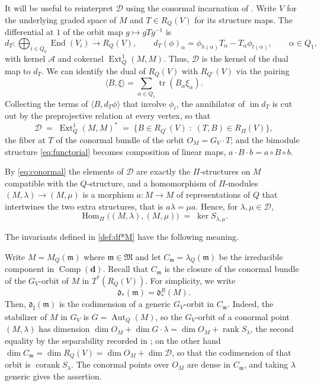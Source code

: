 \documentclass[12pt]{article}
\def\xspace{ }%
\theoremstyle{definition}
\newcommand{\prigity}{pseudorigidity\xspace}
\newcommand{\bd}{\boldsymbol{d}}  %
\newcommand{\tr}{\operatorname{tr}}
\newcommand{\Ext}{\operatorname{Ext}}
\newcommand{\Hom}{\operatorname{Hom}}
\newcommand{\End}{\operatorname{End}}
\newcommand{\Aut}{\operatorname{Aut}}
\newcommand{\Comp}{\operatorname{Comp}}
\newcommand{\cmp}{C}                       %
\newcommand{\Mfr}{\mathfrak{M}}
\newcommand{\mm}{\mathfrak{m}}
\newcommand{\alg}{\mathcal{A}}   %
\newcommand{\bmdl}{\mathcal{D}}   %
\newcommand{\qvert}{Q_0}    %
\newcommand{\qarr}{Q_1}     %
\newcommand{\dfr}{\mathfrak{d}}  %
\newcommand{\Sop}{S}
\newcommand{\rsub}{\sharp}       %
\newcommand{\psub}{\flat}        %
\newcommand{\rank}{\operatorname{rank}}
\newcommand{\cork}{\operatorname{corank}}
\newcommand{\im}{\operatorname{im}}
\begin{document}
It will be useful to reinterpret $\bmdl$ using the conormal incarnation of
. Write $V$ for the underlying graded
space of $M$ and $T \in R_Q(V)$ for its structure maps. The differential at
$1$ of the orbit map $g \mapsto gTg^{-1}$ is
\begin{equation}\label{eq:dT}
   d_T : \bigoplus_{i\in \qvert}\End(V_i)\longrightarrow R_Q(V), \qquad
   d_T(\phi)_\alpha = \phi_{h(\alpha)}T_\alpha - T_\alpha\phi_{t(\alpha)} ,
   \qquad \alpha\in\qarr ,
\end{equation}
with kernel $\alg$ and cokernel $\Ext^1_Q(M,M)$. Thus, $\bmdl$ is the kernel of the dual map to $d_T$.
We can identify the dual of $R_Q(V)$ with $R_{Q^\circ}(V)$ via the pairing
\[
\langle B,\xi\rangle =\sum_{\alpha\in\qarr}\tr(B_\alpha\xi_\alpha).
\]
Collecting the terms of $\langle B, d_T\phi\rangle$ that involve $\phi_i$, the annihilator of
$\im d_T$ is cut out by the preprojective relation at every vertex, so that
\begin{equation}\label{eq:conormal}
   \bmdl \;=\; \Ext^1_Q(M,M)^* \;=\;
   \bigl\{B \in R_{Q^\circ}(V) \;:\; (T,B) \in R_\Pi(V)\bigr\} ,
\end{equation}
the fiber at $T$ of the conormal bundle of the orbit $O_M=G_V\cdot T$; and the
bimodule structure \eqref{eq:functorial} becomes composition of linear maps,
$a\cdot B\cdot b = a\circ B\circ b$.


By \eqref{eq:conormal} the elements of $\bmdl$ are exactly the $\Pi$-structures
on $M$ compatible with the $Q$-structure, and a homomorphism of $\Pi$-modules
$(M,\lambda)\to(M,\mu)$ is a morphism $a : M \to M$ of representations of $Q$
that intertwines the two extra structures, that is $a\lambda = \mu a$. Hence,
for $\lambda,\mu\in\bmdl$,
\begin{equation}\label{eq:hompi}
   \Hom_\Pi\bigl((M,\lambda),(M,\mu)\bigr) \;=\; \ker \Sop_{\lambda,\mu}.
\end{equation}

The invariants defined in \eqref{def:df*M} have the following meaning.

Write $M=M_Q(\mm)$ where $\mm \in \Mfr$ and let $\cmp_\mm=\lambda_Q(\mm)$ be the irreducible component in $\Comp(\bd)$.
Recall that $\cmp_\mm$ is the closure of the conormal bundle of the $G_V$-orbit of $M$ in $T^*(R_Q(V))$.
For simplicity, we write
\[
\dfr_*(\mm)=\dfr_*^R(M).
\]
Then, $\dfr_\rsub(\mm)$ is the codimension of a generic $G_V$-orbit in
$\cmp_\mm$. Indeed, the stabilizer of $M$ in $G_V$ is $G=\Aut_Q(M)$, so the $G_V$-orbit of
a conormal point $(M,\lambda)$ has dimension $\dim O_M + \dim G\cdot\lambda =
\dim O_M + \rank \Sop_\lambda$, the second equality by the
separability recorded in ; on the other hand $\dim \cmp_\mm =
\dim R_Q(V) = \dim O_M + \dim\bmdl$, so that the codimension of that orbit is
$\cork \Sop_\lambda$. The conormal points over $O_M$ are dense in
$\cmp_\mm$, and taking $\lambda$ generic gives the assertion.
\end{document}
